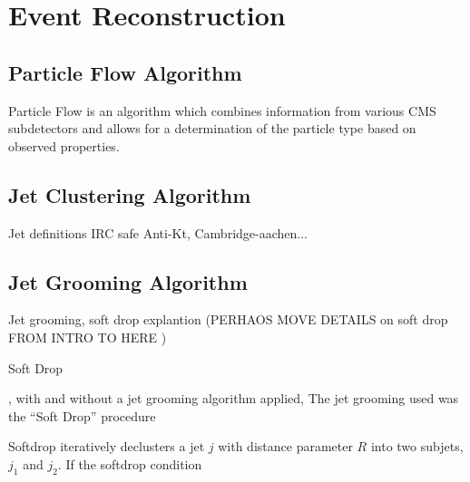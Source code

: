 \chapter{Event Reconstruction}\label{chap:reco}

%



\section{Particle Flow Algorithm}\label{sec:ch3:PFlow}

Particle Flow is an algorithm which combines information from various CMS subdetectors and allows for a determination of the particle type based on observed properties.








\section{Jet Clustering Algorithm}
\label{sec:ch3:clusering}

Jet definitions IRC safe
Anti-Kt, Cambridge-aachen...










\section{Jet Grooming Algorithm}
\label{sec:ch3:grooming}


Jet grooming, soft drop explantion (PERHAOS MOVE DETAILS on soft drop FROM INTRO TO HERE )


Soft Drop



, with and without a jet grooming algorithm applied,
The jet grooming used was the ``Soft Drop''
procedure 

Softdrop iteratively declusters a jet $j$ with distance parameter $R$ into two subjets, $j_1$ and $j_2$.
If the softdrop condition

